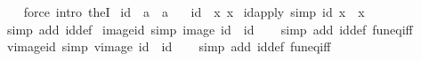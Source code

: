 \begin{isabellebody}
%
\isadelimproof
\ \ %
\endisadelimproof
%
\isatagproof
{}\isamarkupfalse%
\ {\isacharparenleft}{\kern0pt}force\ intro{\isacharcolon}{\kern0pt}\ theI{\isacharprime}{\kern0pt}{\isacharparenright}{\kern0pt}%
\endisatagproof
{\isafoldproof}%
%
\isadelimproof
%
\endisadelimproof
%
\isadelimdocument
%
\endisadelimdocument
%
\isatagdocument
%
\isamarkuptrue%
%
\endisatagdocument
{\isafolddocument}%
%
\isadelimdocument
%
\endisadelimdocument
{}\isamarkupfalse%
\ id\ {\isacharcolon}{\kern0pt}{\isacharcolon}{\kern0pt}\ {\isachardoublequoteopen}{\isacharprime}{\kern0pt}a\ {\isasymRightarrow}\ {\isacharprime}{\kern0pt}a{\isachardoublequoteclose}\isanewline
\ \ \ {\isachardoublequoteopen}id\ {\isacharequal}{\kern0pt}\ {\isacharparenleft}{\kern0pt}{\isasymlambda}x{\isachardot}{\kern0pt}\ x{\isacharparenright}{\kern0pt}{\isachardoublequoteclose}\isanewline
\isanewline
{}\isamarkupfalse%
\ id{\isacharunderscore}{\kern0pt}apply\ {\isacharbrackleft}{\kern0pt}simp{\isacharbrackright}{\kern0pt}{\isacharcolon}{\kern0pt}\ {\isachardoublequoteopen}id\ x\ {\isacharequal}{\kern0pt}\ x{\isachardoublequoteclose}\isanewline
%
\isadelimproof
\ \ %
\endisadelimproof
%
\isatagproof
{}\isamarkupfalse%
\ {\isacharparenleft}{\kern0pt}simp\ add{\isacharcolon}{\kern0pt}\ id{\isacharunderscore}{\kern0pt}def{\isacharparenright}{\kern0pt}%
\endisatagproof
{\isafoldproof}%
%
\isadelimproof
\isanewline
%
\endisadelimproof
\isanewline
{}\isamarkupfalse%
\ image{\isacharunderscore}{\kern0pt}id\ {\isacharbrackleft}{\kern0pt}simp{\isacharbrackright}{\kern0pt}{\isacharcolon}{\kern0pt}\ {\isachardoublequoteopen}image\ id\ {\isacharequal}{\kern0pt}\ id{\isachardoublequoteclose}\isanewline
%
\isadelimproof
\ \ %
\endisadelimproof
%
\isatagproof
{}\isamarkupfalse%
\ {\isacharparenleft}{\kern0pt}simp\ add{\isacharcolon}{\kern0pt}\ id{\isacharunderscore}{\kern0pt}def\ fun{\isacharunderscore}{\kern0pt}eq{\isacharunderscore}{\kern0pt}iff{\isacharparenright}{\kern0pt}%
\endisatagproof
{\isafoldproof}%
%
\isadelimproof
\isanewline
%
\endisadelimproof
\isanewline
{}\isamarkupfalse%
\ vimage{\isacharunderscore}{\kern0pt}id\ {\isacharbrackleft}{\kern0pt}simp{\isacharbrackright}{\kern0pt}{\isacharcolon}{\kern0pt}\ {\isachardoublequoteopen}vimage\ id\ {\isacharequal}{\kern0pt}\ id{\isachardoublequoteclose}\isanewline
%
\isadelimproof
\ \ %
\endisadelimproof
%
\isatagproof
{}\isamarkupfalse%
\ {\isacharparenleft}{\kern0pt}simp\ add{\isacharcolon}{\kern0pt}\ id{\isacharunderscore}{\kern0pt}def\ fun{\isacharunderscore}{\kern0pt}eq{\isacharunderscore}{\kern0pt}iff{\isacharparenright}{\kern0pt}%

\end{isabellebody}
